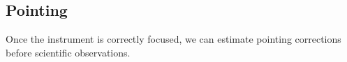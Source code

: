 

\subsection{Pointing}
\label{se:pointing}

Once the instrument is correctly focused, we can estimate pointing corrections
before scientific observations.



